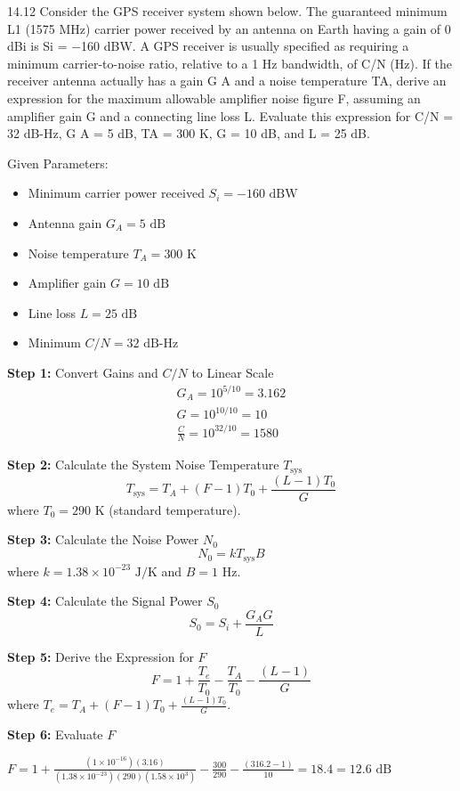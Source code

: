 \documentclass[cn,12pt]{homework}
\begin{document}
14.12 Consider the GPS receiver system shown below. The guaranteed minimum L1 (1575 MHz) carrier
power received by an antenna on Earth having a gain of 0 dBi is Si = −160 dBW. A GPS receiver is
usually specified as requiring a minimum carrier-to-noise ratio, relative to a 1 Hz bandwidth, of C/N
(Hz). If the receiver antenna actually has a gain G A and a noise temperature TA, derive an expression
for the maximum allowable amplifier noise figure F, assuming an amplifier gain G and a connecting
line loss L. Evaluate this expression for C/N = 32 dB-Hz, G A = 5 dB, TA = 300 K, G = 10 dB,
and L = 25 dB.

\begin{solution}

Given Parameters:
\begin{itemize}
    \item Minimum carrier power received \( S_i = -160 \text{ dBW} \)
    \item Antenna gain \( G_A = 5 \text{ dB} \)
    \item Noise temperature \( T_A = 300 \text{ K} \)
    \item Amplifier gain \( G = 10 \text{ dB} \)
    \item Line loss \( L = 25 \text{ dB} \)
    \item Minimum \( C/N = 32 \text{ dB-Hz} \)
\end{itemize}

\textbf{Step 1:} Convert Gains and \( C/N \) to Linear Scale
\[
\begin{array}{l}
G_A = 10^{5/10} = 3.162 \\
G = 10^{10/10} = 10 \\
\frac{C}{N} = 10^{32/10} = 1580
\end{array}
\]

\textbf{Step 2:} Calculate the System Noise Temperature \( T_{\text{sys}} \)
\[
T_{\text{sys}} = T_A + (F - 1)T_0 + \frac{(L - 1)T_0}{G}
\]
where \( T_0 = 290 \text{ K} \) (standard temperature).

\textbf{Step 3:} Calculate the Noise Power \( N_0 \)
\[
N_0 = kT_{\text{sys}}B
\]
where \( k = 1.38 \times 10^{-23} \text{ J/K} \) and \( B = 1 \text{ Hz} \).

\textbf{Step 4:} Calculate the Signal Power \( S_0 \)
\[
S_0 = S_i + \frac{G_A G}{L}
\]

\textbf{Step 5:} Derive the Expression for \( F \)
\[
F = 1 + \frac{T_e}{T_0} - \frac{T_A}{T_0} - \frac{(L - 1)}{G}
\]
where \( T_e = T_A + (F - 1)T_0 + \frac{(L - 1)T_0}{G} \).

\textbf{Step 6:} Evaluate \( F \)

$F = 1 + \frac{(1 \times 10^{-16})(3.16)}{(1.38 \times 10^{-23})(290)(1.58 \times 10^3)} - \frac{300}{290} - \frac{(316.2-1)}{10} = 18.4 = 12.6 \text{ dB}$
\end{solution}
\end{document}
